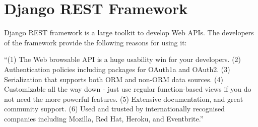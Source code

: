 \section{Django REST Framework}


Django REST framework is a large toolkit to develop Web APIs. The
developers of the framework provide the following reasons for using it:

``(1) The Web browsable API is a huge usability win for your
developers.  (2) Authentication policies including packages for
OAuth1a and OAuth2.  (3) Serialization that supports both ORM and
non-ORM data sources.  (4) Customizable all the way down - just use
regular function-based views if you do not need the more powerful
features.  (5) Extensive documentation, and great community support.
(6) Used and trusted by internationally recognised companies including
Mozilla, Red Hat, Heroku, and Eventbrite.''

